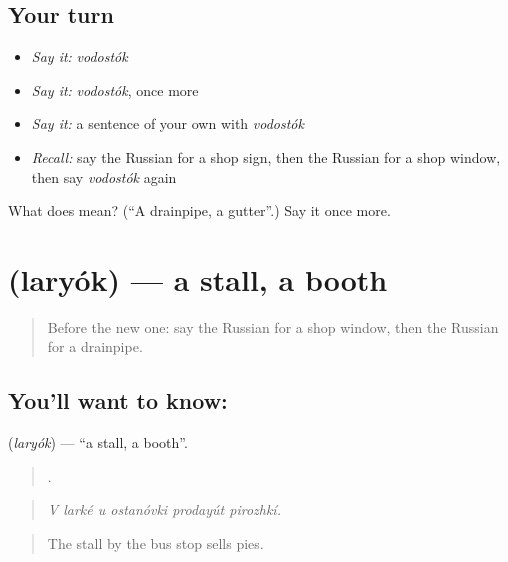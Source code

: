 \subsection*{Your turn}
\begin{itemize}
\raggedright
  \item \emph{Say it:} \emph{vodostók}
  \item \emph{Say it:} \emph{vodostók}, once more
  \item \emph{Say it:} a sentence of your own with \emph{vodostók}
  \item \emph{Recall:} say the Russian for a shop sign, then the Russian for a shop window, then say \emph{vodostók} again
\end{itemize}

\begin{tcolorbox}[breakable,colback=teal!4,colframe=teal!35!black,title={Before you move on}]
What does  mean? (\textquotedblleft{}A drainpipe, a gutter\textquotedblright{}.) Say it once more.
\end{tcolorbox}
\section[\texorpdfstring{\ru{ларёк} (laryók)}{ларёк (laryók)}]{ (laryók) — a stall, a booth}

\label{lesson:RU-C446-laryok}



\begin{quote}
Before the new one: say the Russian for a shop window, then the Russian for a drainpipe.
\end{quote}

\subsection*{You'll want to know: }
\textbf{} (\emph{laryók}) — \textquotedblleft{}a stall, a booth\textquotedblright{}.

\begin{quote}
     .
\end{quote}

\begin{quote}
\emph{V larké u ostanóvki prodayút pirozhkí.}
\end{quote}

\begin{quote}
The stall by the bus stop sells pies.
\end{quote}

